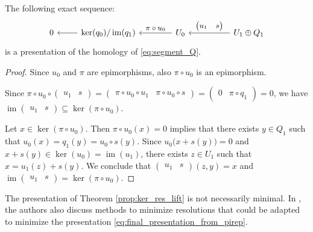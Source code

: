 \documentclass[english,a4paper,nolineno,cleveref]{socg-lipics-v2021}
\DeclareMathOperator{\im}{im}
\begin{document}
\begin{theorem} \label{prop:ker_res_lift}
The following exact sequence:
\begin{equation} \label{eq:final_presentation_from_pirep}
\begin{tikzcd}[ampersand replacement=\&,every label/.append style = {font = \small}]
0 \& \ker(q_0)/\im(q_1) \arrow[l] \&[15pt] U_0 \arrow{l}[swap]{\pi\circ u_0} \&[25pt] U_1\oplus Q_1 \arrow{l}[swap]{\begin{pmatrix}u_1 & s\end{pmatrix}}
\end{tikzcd}
\end{equation}
is a presentation of the homology of \eqref{eq:segment_Q}.
\end{theorem}

\begin{proof}
Since $u_0$ and $\pi$ are epimorphisms, also $\pi\circ u_0$ is an epimorphism. 

Since $\pi\circ u_0\circ \begin{pmatrix}u_1 & s\end{pmatrix}=\begin{pmatrix}\pi\circ u_0\circ u_1 & \pi\circ u_0\circ s\end{pmatrix}=\begin{pmatrix}0 & \pi\circ q_1\end{pmatrix}=0$, we have $\im\begin{pmatrix}u_1 & s\end{pmatrix}\subseteq\ker(\pi\circ u_0)$.

Let $x\in \ker(\pi\circ u_0)$. Then $\pi\circ u_0(x)=0$ implies that there exists $y\in Q_1$ such that $u_0(x)=q_1(y)=u_0\circ s(y)$. Since $u_0\big(x+s(y)\big)=0$ and $x+s(y)\in\ker(u_0)=\im(u_1)$, there exists $z\in U_1$ such that $x=u_1(z)+s(y)$. We conclude that $\begin{pmatrix}u_1 & s\end{pmatrix}(z,y)=x$ and $\im\begin{pmatrix}u_1 & s\end{pmatrix}=\ker(\pi\circ u_0)$.
\end{proof}


The presentation of Theorem \ref{prop:ker_res_lift} is not necessarily minimal. In \cite{brown2024discretemicrolocalmorsetheory}, the authors also discuss methods to minimize resolutions that could be adapted to minimize the presentation \eqref{eq:final_presentation_from_pirep}.
\end{document}
